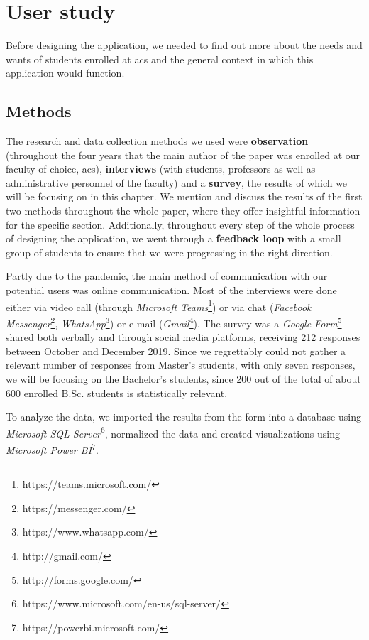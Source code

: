 \chapter{User study} \label{chapter3}

Before designing the application, we needed to find out more about the needs and wants of students enrolled at \acrshort{acs} and the general context in which this application would function.

\section{Methods} \label{3:methods}

The research and data collection methods we used were \textbf{observation} (throughout the four years that the main author of the paper was enrolled at our faculty of choice, \acrshort{acs}), \textbf{interviews} (with students, professors as well as administrative personnel of the faculty) and a \textbf{survey}, the results of which we will be focusing on in this chapter.  We mention and discuss the results of the first two methods throughout the whole paper, where they offer insightful information for the specific section. Additionally, throughout every step of the whole process of designing the application, we went through a \textbf{feedback loop} with a small group of students to ensure that we were progressing in the right direction.

Partly due to the pandemic, the main method of communication with our potential users was online communication. Most of the interviews were done either via video call (through \textit{Microsoft Teams}\footnote{https://teams.microsoft.com/}) or via chat (\textit{Facebook Messenger}\footnote{https://messenger.com/}, \textit{WhatsApp}\footnote{https://www.whatsapp.com/}) or e-mail (\textit{Gmail}\footnote{http://gmail.com/}). The survey was a \textit{Google Form}\footnote{http://forms.google.com/} shared both verbally and through social media platforms, receiving 212 responses between October and December 2019. Since we regrettably could not gather a relevant number of responses from Master's students, with only seven responses, we will be focusing on the Bachelor's students, since 200 out of the total of about 600 enrolled B.Sc. students is statistically relevant.

To analyze the data, we imported the results from the form into a database using \textit{Microsoft SQL Server}\footnote{https://www.microsoft.com/en-us/sql-server/}, normalized the data and created visualizations using \textit{Microsoft Power BI}\footnote{https://powerbi.microsoft.com/}.

